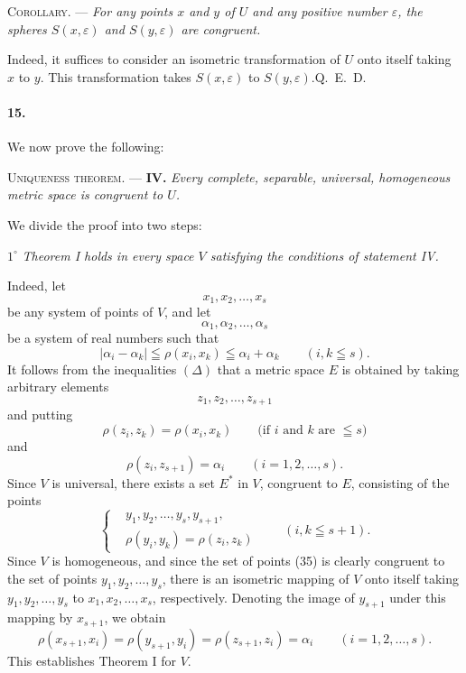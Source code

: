 \documentclass[a4paper,12pt]{amsart}
\newcommand{\srcpage}[1]{} %
\begin{document}
\textsc{Corollary.} --- \textit{For any points $x$ and $y$ of $U$ and any positive number $\varepsilon$, the spheres $S(x,\varepsilon)$ and $S(y,\varepsilon)$ are congruent.}

Indeed, it suffices to consider an isometric transformation of $U$ onto itself taking $x$ to $y$. This transformation takes $S(x,\varepsilon)$ to $S(y,\varepsilon)$.\hfill \mbox{Q. E. D.}

\paragraph{15.}
We now prove the following:

\textsc{Uniqueness theorem.} --- \textbf{IV.} \textit{Every complete, separable, universal, homogeneous metric space is congruent to $U$.}

We divide the proof into two steps:
\srcpage{77}

$1^\circ$ \textit{Theorem I holds in every space $V$ satisfying the conditions of statement IV.}

Indeed, let
\begin{equation}\tag{35}
x_1,x_2,\dots,x_s
\end{equation}
be any system of points of $V$, and let
\begin{equation}\tag{36}
\alpha_1,\alpha_2,\dots,\alpha_s
\end{equation}
be a system of real numbers such that
\begin{equation}\tag{$\Delta$}
|\alpha_i-\alpha_k|\leqq\rho(x_i,x_k)\leqq\alpha_i+\alpha_k\qquad(i,k\leqq s).
\end{equation}
It follows from the inequalities $(\Delta)$ that a metric space $E$ is obtained by taking arbitrary elements
\[
z_1,z_2,\dots,z_{s+1}
\]
and putting
\begin{equation}\tag{37}
\rho(z_i,z_k)=\rho(x_i,x_k)\qquad\text{(if $i$ and $k$ are $\leqq s$)}
\end{equation}
and
\begin{equation}\tag{38}
\rho(z_i,z_{s+1})=\alpha_i\qquad(i=1,2,\dots,s).
\end{equation}
Since $V$ is universal, there exists a set $E^*$ in $V$, congruent to $E$, consisting of the points
\begin{equation}\tag{39}
\left\{\begin{aligned}
&y_1,y_2,\dots,y_s,y_{s+1},\\
&\rho(y_i,y_k)=\rho(z_i,z_k)
\end{aligned}\right.\qquad(i,k\leqq s+1).
\end{equation}
Since $V$ is homogeneous, and since the set of points (35) is clearly congruent to the set of points $y_1,y_2,\dots,y_s$, there is an isometric mapping of $V$ onto itself taking $y_1,y_2,\dots,y_s$ to $x_1,x_2,\dots,x_s$, respectively. Denoting the image of $y_{s+1}$ under this mapping by $x_{s+1}$, we obtain
\[
\rho(x_{s+1},x_i)=\rho(y_{s+1},y_i)=\rho(z_{s+1},z_i)=\alpha_i\qquad(i=1,2,\dots,s).
\]
This establishes Theorem I for $V$.
\end{document}
